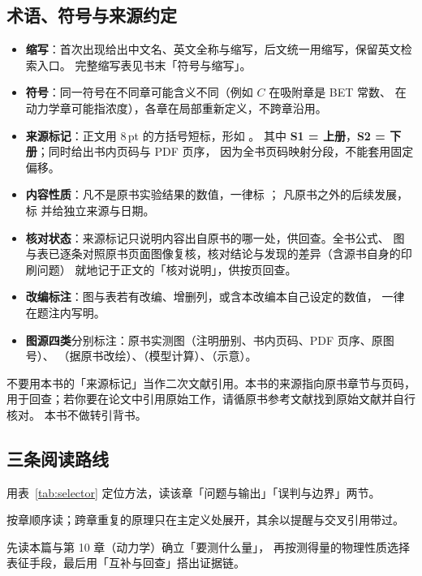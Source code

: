 \subsection{术语、符号与来源约定}

\begin{itemize}
\item \textbf{缩写}：首次出现给出中文名、英文全称与缩写，后文统一用缩写，保留英文检索入口。
完整缩写表见书末「符号与缩写」。
\item \textbf{符号}：同一符号在不同章可能含义不同（例如 $C$ 在吸附章是 BET 常数、
在动力学章可能指浓度），各章在局部重新定义，不跨章沿用。
\item \textbf{来源标记}：正文用 8\,pt 的方括号短标，形如
。
其中 \textbf{S1 = 上册}，\textbf{S2 = 下册}；同时给出书内页码与 PDF 页序，
因为全书页码映射分段，不能套用固定偏移。
\item \textbf{内容性质}：凡不是原书实验结果的数值，一律标 \pedset{}；
凡原书之外的后续发展，标 \supp{} 并给独立来源与日期。
\item \textbf{核对状态}：来源标记只说明内容出自原书的哪一处，供回查。全书公式、
图与表已逐条对照原书页面图像复核，核对结论与发现的差异（含源书自身的印刷问题）
就地记于正文的「核对说明」，供按页回查。
\item \textbf{改编标注}：图与表若有改编、增删列，或含本改编本自己设定的数值，
一律在题注内写明。
\item \textbf{图源四类}分别标注：原书实测图（注明册别、书内页码、PDF 页序、原图号）、
\redrawmark（据原书改绘）、\modelmark（模型计算）、\schemamark（示意）。
\end{itemize}

\begin{pitfall}
不要用本书的「来源标记」当作二次文献引用。本书的来源指向原书章节与页码，
用于回查；若你要在论文中引用原始工作，请循原书参考文献找到原始文献并自行核对。
本书不做转引背书。
\end{pitfall}

\subsection{三条阅读路线}

\begin{description}[leftmargin=0pt,style=nextline,font=\heiti]
\item[快速查阅] 用表~\ref{tab:selector} 定位方法，读该章「问题与输出」「误判与边界」两节。
\item[系统学习] 按章顺序读；跨章重复的原理只在主定义处展开，其余以提醒与交叉引用带过。
\item[方案设计] 先读本篇与第 10 章（动力学）确立「要测什么量」，
再按测得量的物理性质选择表征手段，最后用「互补与回查」搭出证据链。
\end{description}
